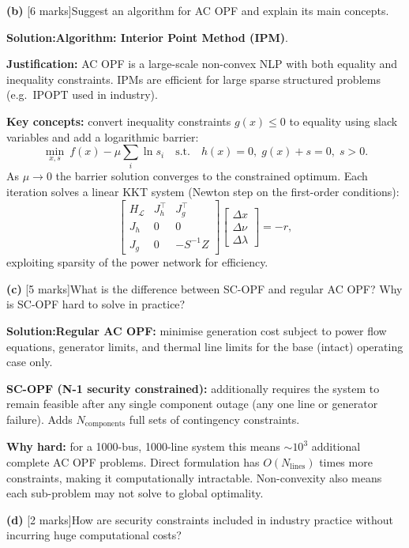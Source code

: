 \documentclass[10pt,a4paper]{article}
\newcommand{\Sol}{\par\vspace{4pt}\noindent\textbf{Solution:}\enspace}
\begin{document}
\vspace{4pt}
\noindent\textbf{(b)} [6 marks]\quad Suggest an algorithm for AC OPF and
explain its main concepts.

\Sol \textbf{Algorithm: Interior Point Method (IPM)}.

\textbf{Justification:} AC OPF is a large-scale non-convex NLP with both
equality and inequality constraints. IPMs are efficient for large sparse
structured problems (e.g.\ IPOPT used in industry).

\textbf{Key concepts:} convert inequality constraints $g(x)\leq0$ to equality
using slack variables and add a logarithmic barrier:
\[
  \min_{x,s}\ f(x) - \mu\sum_i\ln s_i
  \quad\text{s.t.}\quad h(x)=0,\; g(x)+s=0,\; s>0.
\]
As $\mu\to0$ the barrier solution converges to the constrained optimum. Each
iteration solves a linear KKT system (Newton step on the first-order conditions):
\[
  \begin{bmatrix}H_{\mathcal{L}} & J_h^\top & J_g^\top\\
  J_h & 0 & 0\\ J_g & 0 & -S^{-1}Z\end{bmatrix}
  \begin{bmatrix}\Delta x\\\Delta\nu\\\Delta\lambda\end{bmatrix}
  = -r,
\]
exploiting sparsity of the power network for efficiency.

\vspace{4pt}
\noindent\textbf{(c)} [5 marks]\quad What is the difference between SC-OPF and
regular AC OPF? Why is SC-OPF hard to solve in practice?

\Sol \textbf{Regular AC OPF:} minimise generation cost subject to power flow
equations, generator limits, and thermal line limits for the base (intact)
operating case only.

\textbf{SC-OPF (N-1 security constrained):} additionally requires the system
to remain feasible after any single component outage (any one line or
generator failure). Adds $N_{\text{components}}$ full sets of contingency
constraints.

\textbf{Why hard:} for a 1000-bus, 1000-line system this means $\sim10^3$
additional complete AC OPF problems. Direct formulation has $O(N_{\text{lines}})$
times more constraints, making it computationally intractable. Non-convexity
also means each sub-problem may not solve to global optimality.

\vspace{4pt}
\noindent\textbf{(d)} [2 marks]\quad How are security constraints included in
industry practice without incurring huge computational costs?
\end{document}
